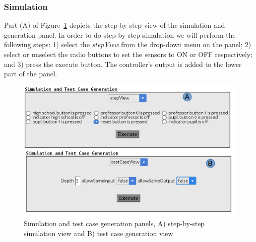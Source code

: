 \subsubsection{Simulation}
\vspace{-.2cm}
Part (A) of Figure~\ref{fig:PanelView} depicts the
step-by-step view of the simulation and generation panel. In order to do
step-by-step simulation we will perform the following steps: 1) select the
\textsf{\emph{stepView}} from the drop-down menu on the panel; 2) select or
unselect the radio buttons to set the sensors to \textsf{ON} or \textsf{OFF}
respectively; and 3) press the execute button.
The controller's output is added to the lower part of the panel.
\begin{figure}[!h]
\centering
\includegraphics[width=.9\textwidth]{./images/Two_Views_Panel.png}
\caption{Simulation and test case generation panels, A) step-by-step simulation
view and B) test case generation view}
\label{fig:PanelView}
\vspace{-.2cm}
\end{figure}
\vspace{-.2cm}

